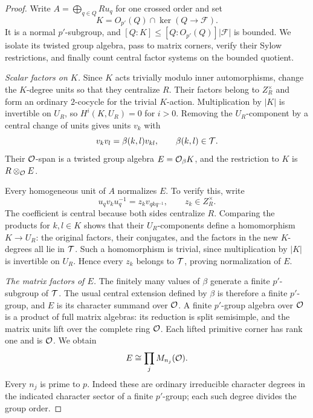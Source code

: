 \begin{proof}
Write $A=\bigoplus_{q\in Q}Ru_q$ for one crossed order and set
\begin{equation}\label{eq:large-kernel}
 K=O_{p'}(Q)\cap\ker(Q\longrightarrow\mathcal F).
\end{equation}
It is a normal $p'$-subgroup, and
$[Q:K]\leq[Q:O_{p'}(Q)]|\mathcal F|$ is bounded.
We isolate its twisted group algebra, pass to matrix corners,
verify their Sylow restrictions, and finally count central factor
systems on the bounded quotient.

\emph{Scalar factors on $K$.}
Since $K$ acts trivially modulo inner automorphisms, change the
$K$-degree units so that they centralize $R$.  Their factors
belong to $Z_R^\times$ and form an ordinary $2$-cocycle for
the trivial $K$-action.  Multiplication by $|K|$ is invertible
on $U_R$, so $H^i(K,U_R)=0$ for $i>0$.  Removing the
$U_R$-component by a central change of units gives units $v_k$
with
\[
 v_kv_l=\beta(k,l)v_{kl},\qquad \beta(k,l)\in\mathcal T.
\]
Their $\mathcal O$-span is a twisted group algebra
$E=\mathcal O_\beta K$, and the restriction to $K$ is
$R\otimes_{\mathcal O}E$.

Every homogeneous unit of $A$ normalizes $E$.  To verify this,
write
\[
 u_qv_ku_q^{-1}=z_kv_{qkq^{-1}},\qquad z_k\in Z_R^\times.
\]
The coefficient is central because both sides centralize $R$.
Comparing the products for $k,l\in K$ shows that their
$U_R$-components define a homomorphism $K\to U_R$: the
original factors, their conjugates, and the factors in the
new $K$-degrees all lie in $\mathcal T$.  Such a homomorphism is
trivial, since multiplication by $|K|$ is invertible on
$U_R$.  Hence every $z_k$ belongs to $\mathcal T$, proving
normalization of $E$.

\emph{The matrix factors of $E$.}
The finitely many values of $\beta$ generate a finite
$p'$-subgroup of $\mathcal T$.  The usual central extension defined
by $\beta$ is therefore a finite $p'$-group, and $E$ is its
character summand over $\mathcal O$.  A finite $p'$-group algebra
over $\mathcal O$ is a product of full matrix algebras: its reduction
is split semisimple, and the matrix units lift over the
complete ring $\mathcal O$.  Each lifted primitive corner has rank
one and is $\mathcal O$.  We obtain
\begin{equation}\label{eq:matrix-E}
 E\cong\prod_j M_{n_j}(\mathcal O).
\end{equation}
Every $n_j$ is prime to $p$.  Indeed these are ordinary
irreducible character degrees in the indicated character
sector of a finite $p'$-group; each such degree divides the
group order.


\end{proof}
